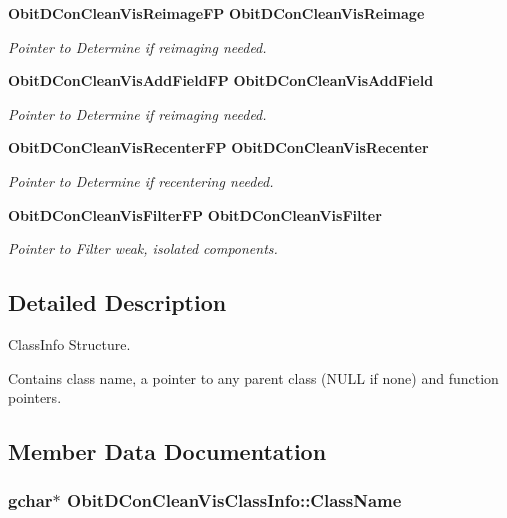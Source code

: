 \begin{CompactItemize}
{\bf Obit\-DCon\-Clean\-Vis\-Reimage\-FP} {\bf Obit\-DCon\-Clean\-Vis\-Reimage}
\begin{CompactList}\small\item\em Pointer to Determine if reimaging needed. \item\end{CompactList}\item 
{\bf Obit\-DCon\-Clean\-Vis\-Add\-Field\-FP} {\bf Obit\-DCon\-Clean\-Vis\-Add\-Field}
\begin{CompactList}\small\item\em Pointer to Determine if reimaging needed. \item\end{CompactList}\item 
{\bf Obit\-DCon\-Clean\-Vis\-Recenter\-FP} {\bf Obit\-DCon\-Clean\-Vis\-Recenter}
\begin{CompactList}\small\item\em Pointer to Determine if recentering needed. \item\end{CompactList}\item 
{\bf Obit\-DCon\-Clean\-Vis\-Filter\-FP} {\bf Obit\-DCon\-Clean\-Vis\-Filter}
\begin{CompactList}\small\item\em Pointer to Filter weak, isolated components. \item\end{CompactList}\end{CompactItemize}


\subsection{Detailed Description}
Class\-Info Structure. 

Contains class name, a pointer to any parent class (NULL if none) and function pointers. 



\subsection{Member Data Documentation}
\subsubsection{\setlength{\rightskip}{0pt plus 5cm}gchar$\ast$ {\bf Obit\-DCon\-Clean\-Vis\-Class\-Info::Class\-Name}}\label{structObitDConCleanVisClassInfo_o2}


